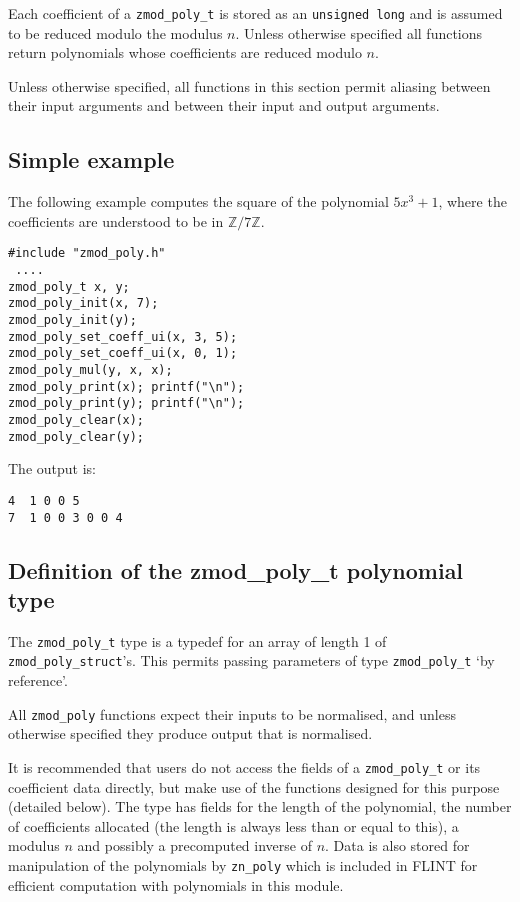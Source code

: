 \documentclass[a4paper,10pt]{article}
\newcommand{\Z}{\mathbb{Z}}
\newcommand{\code}{\lstinline}
\begin{document}
Each coefficient of a \code{zmod_poly_t} is stored as an \code{unsigned long} and is assumed to be reduced modulo the modulus $n$. Unless otherwise specified all functions return polynomials whose coefficients are reduced modulo $n$.

Unless otherwise specified, all functions in this section permit aliasing between their input arguments and between their input and output arguments. 

\subsection{Simple example}

The following example computes the square of the polynomial $5x^3 + 1$, where the coefficients are understood to be in $\Z/7\Z$.

\begin{lstlisting}
#include "zmod_poly.h"
 ....
zmod_poly_t x, y;
zmod_poly_init(x, 7);
zmod_poly_init(y);
zmod_poly_set_coeff_ui(x, 3, 5);
zmod_poly_set_coeff_ui(x, 0, 1);
zmod_poly_mul(y, x, x);
zmod_poly_print(x); printf("\n");
zmod_poly_print(y); printf("\n");
zmod_poly_clear(x);
zmod_poly_clear(y);
\end{lstlisting}

The output is:

\begin{lstlisting}
4  1 0 0 5
7  1 0 0 3 0 0 4
\end{lstlisting}

\subsection{Definition of the zmod\_poly\_t polynomial type}

The \code{zmod_poly_t} type is a typedef for an array of length 1 of \code{zmod_poly_struct}'s. This permits passing parameters  of type \code{zmod_poly_t} `by reference'. 

All \code{zmod_poly} functions expect their inputs to be normalised, and unless otherwise specified they produce output that is normalised. 

It is recommended that users do not access the fields of a \code{zmod_poly_t} or its coefficient data directly, but make use of the functions designed for this purpose (detailed below). The type has fields for the length of the polynomial, the number of coefficients allocated (the length is always less than or equal to this), a modulus $n$ and possibly a precomputed inverse of $n$. Data is also stored for manipulation of the polynomials by \code{zn_poly} which is included in FLINT for efficient computation with polynomials in this module.
\end{document}
